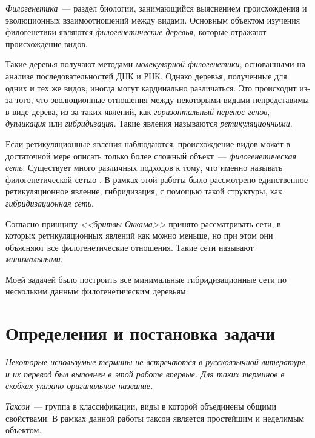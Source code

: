 \documentclass[14pt]{matmex-diploma-custom}
\begin{document}
    \textit{Филогенетика}~--- раздел биологии, занимающийся выяснением происхождения и 
    эволюционных взаимоотношений между видами. Основным объектом изучения филогенетики являются
    \textit{филогенетические деревья}, которые отражают происхождение видов.
    
    \bigskip
    
    Такие деревья получают методами \textit{молекулярной филогенетики}, основанными
    на анализе последовательностей ДНК и РНК. Однако деревья, полученные
    для одних и тех же видов, иногда могут кардинально различаться. Это происходит из-за
    того, что эволюционные отношения между некоторыми видами непредставимы в виде
    дерева, из-за таких явлений, как \textit{горизонтальный перенос генов}, \textit{дупликация} или \textit{гибридизация}. Такие явления называются \textit{ретикуляционными}.
    
    \bigskip
    
    Если ретикуляционные явления наблюдаются, происхождение видов может в достаточной мере
    описать только более сложный объект~--- \textit{филогенетическая сеть}. Существует много
    различных подходов к тому, что именно называть филогенетической сетью \cite{Huson:2011:PNC:1971979}. В рамках этой работы было рассмотрено единственное ретикуляционное явление, гибридизация, с помощью такой структуры, как \textit{гибридизационная сеть}.
    
    \bigskip
    
    Согласно принципу \textit{<<бритвы Оккама>>} принято рассматривать сети, в которых
    ретикуляционных явлений как можно меньше, но при этом они объясняют все филогенетические
    отношения. Такие сети называют \textit{минимальными}.
    
    \bigskip
    
    Моей задачей было построить все минимальные гибридизационные сети по нескольким данным филогенетическим деревьям.

\section{Определения и постановка задачи}

\textit{Некоторые использумые термины не встречаются в русскоязычной литературе, и их перевод был выполнен в этой работе впервые. Для таких терминов в скобках указано оригинальное название.}

\bigskip

    \textit{Таксон}~--- группа в классификации, виды в которой объединены общими свойствами. В рамках
    данной работы таксон является простейшим и неделимым объектом.
    
\end{document}
